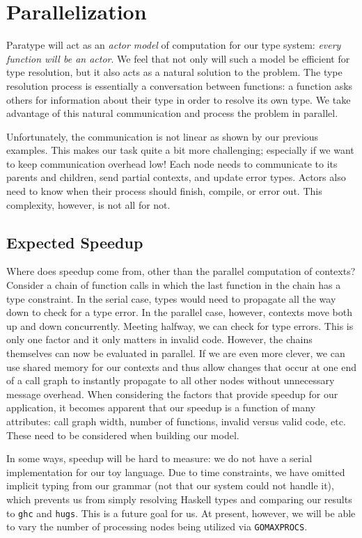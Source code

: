 \documentclass{acm_proc_article-sp}
\begin{document}

\section{Parallelization}

Paratype will act as an \emph{actor model} of computation for our type
system: \emph{every function will be an actor}. We feel that not only will
such a model be efficient for type resolution, but it also acts as a
natural solution to the problem. The type resolution process is
essentially a conversation between functions: a function asks others for
information about their type in order to resolve its own type. We take
advantage of this natural communication and process the problem in
parallel.

Unfortunately, the communication is not linear as shown by our
previous examples. This makes our task quite a bit more challenging;
especially if we want to keep communication overhead low! Each node
needs to communicate to its parents and children, send partial
contexts, and update error types. Actors also need to know when their
process should finish, compile, or error out. This complexity,
however, is not all for not.

\subsection{Expected Speedup}

Where does speedup come from, other than the parallel computation of
contexts? Consider a chain of function calls in which the last
function in the chain has a type constraint. In the serial case, types
would need to propagate all the way down to check for a type error. In
the parallel case, however, contexts move both up and down
concurrently. Meeting halfway, we can check for type errors. This
is only one factor and it only matters in invalid code. However, the
chains themselves can now be evaluated in parallel. If we are even
more clever, we can use shared memory for our contexts and thus allow
changes that occur at one end of a call graph to instantly propagate
to all other nodes without unnecessary message overhead. When
considering the factors that provide speedup for our application, it
becomes apparent that our speedup is a function of many attributes:
call graph width, number of functions, invalid versus valid code, etc.
These need to be considered when building our model.

In some ways, speedup will be hard to measure: we do not have a serial
implementation for our toy language. Due to time constraints, we
have omitted implicit typing from our grammar (not that our system
could not handle it), which prevents us from simply resolving Haskell
types and comparing our results to \texttt{ghc} and
\texttt{hugs}. This is a future goal for us. At present, however,
we will be able to vary the number of processing nodes being
utilized via \texttt{GOMAXPROCS}.
\end{document}
